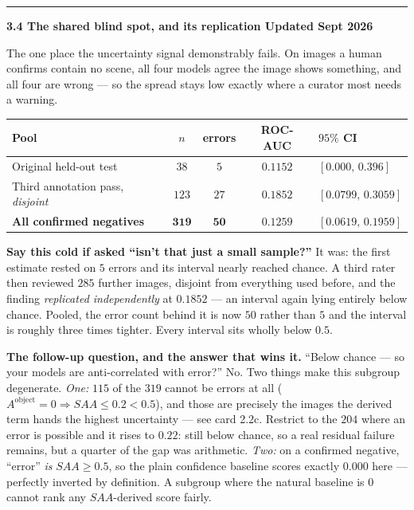 \documentclass[11pt,a4paper]{article}
\newcommand{\status}[1]{\hfill\textcolor{AccentInk}{\small\textbf{#1}}}
\newenvironment{formulacard}[1]
  {\medskip\noindent\rule{\linewidth}{0.6pt}\par\vspace{2pt}\textbf{\large #1}\par\vspace{4pt}}
  {\par\vspace{4pt}}
\newcommand{\notebox}[2]{%
  \par\medskip\noindent
  \colorbox{#1!12}{%
    \begin{minipage}{0.965\linewidth}
    \vspace{2pt}#2\vspace{4pt}
    \end{minipage}%
  }\par\medskip
}
\begin{document}
\begin{formulacard}{3.4 \quad The shared blind spot, and its replication \status{Updated Sept 2026}}
The one place the uncertainty signal demonstrably fails. On images a human confirms contain no scene, all four models agree the image shows something, and all four are wrong --- so the spread stays low exactly where a curator most needs a warning.
\begin{center}\small
\begin{tabular}{@{}l c c c l@{}}
\toprule
\textbf{Pool} & \textbf{$n$} & \textbf{errors} & \textbf{ROC-AUC} & \textbf{$95\%$ CI} \\
\midrule
Original held-out test & $38$ & $5$ & $0.1152$ & $[0.000,\,0.396]$ \\
Third annotation pass, \emph{disjoint} & $123$ & $27$ & $0.1852$ & $[0.0799,\,0.3059]$ \\
\textbf{All confirmed negatives} & $\mathbf{319}$ & $\mathbf{50}$ & $\mathbf{0.1259}$ & $[0.0619,\,0.1959]$ \\
\bottomrule
\end{tabular}
\end{center}
\notebox{GoodInk}{\textbf{Say this cold if asked ``isn't that just a small sample?''} It was: the first estimate rested on $5$ errors and its interval nearly reached chance. A third rater then reviewed $285$ further images, disjoint from everything used before, and the finding \emph{replicated independently} at $0.1852$ --- an interval again lying entirely below chance. Pooled, the error count behind it is now $50$ rather than $5$ and the interval is roughly three times tighter. Every interval sits wholly below $0.5$.}
\notebox{GoodInk}{\textbf{The follow-up question, and the answer that wins it.} ``Below chance --- so your models are anti-correlated with error?'' No. Two things make this subgroup degenerate. \emph{One:} $115$ of the $319$ cannot be errors at all ($A^{\text{object}}=0 \Rightarrow SAA\le0.2 < 0.5$), and those are precisely the images the derived term hands the highest uncertainty --- see card 2.2c. Restrict to the $204$ where an error is possible and it rises to $0.22$: still below chance, so a real residual failure remains, but a quarter of the gap was arithmetic. \emph{Two:} on a confirmed negative, ``error'' \emph{is} $SAA\ge0.5$, so the plain confidence baseline scores exactly $\mathbf{0.000}$ here --- perfectly inverted by definition. A subgroup where the natural baseline is $0$ cannot rank any $SAA$-derived score fairly.}


\end{formulacard}
\end{document}
